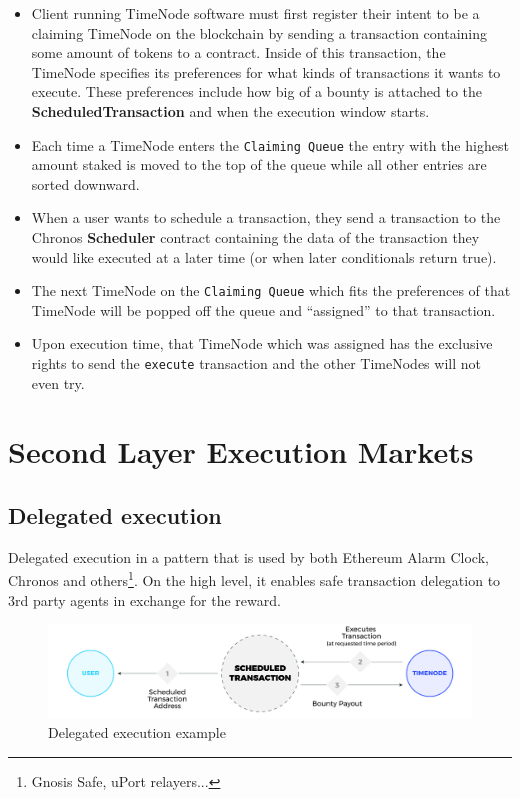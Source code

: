 \documentclass{report}
\begin{document}
  \begin{itemize}
    \item Client running TimeNode software must first register their intent to be a claiming TimeNode on the blockchain by sending a transaction containing some amount of tokens to a contract. Inside of this transaction, the TimeNode specifies its preferences for what kinds of transactions it wants to execute. These preferences include how big of a bounty is attached to the \textbf{ScheduledTransaction} and when the execution window starts.
    \item Each time a TimeNode enters the \texttt{Claiming Queue} the entry with the highest amount staked is moved to the top of the queue while all other entries are sorted downward.
    \item When a user wants to schedule a transaction, they send a transaction to the Chronos \textbf{Scheduler} contract containing the data of the transaction they would like executed at a later time (or when later conditionals return true).
    \item The next TimeNode on the \texttt{Claiming Queue} which fits the preferences of that TimeNode will be popped off the queue and “assigned” to that transaction.
    \item Upon execution time, that TimeNode which was assigned has the exclusive rights to send the \texttt{execute} transaction and the other TimeNodes will not even try.
  \end{itemize}

  \chapter{Second Layer Execution Markets}
  \section{Delegated execution}
  Delegated execution in a pattern that is used by both Ethereum Alarm Clock, Chronos and others\footnote{Gnosis Safe, uPort relayers...}. On the high level, it enables safe transaction delegation to 3rd party agents in exchange for the reward.

  \begin{figure}[h]
    \includegraphics[width=\textwidth]{delegated_execution}
    \caption{Delegated execution example}
  \end{figure}
  
\end{document}
